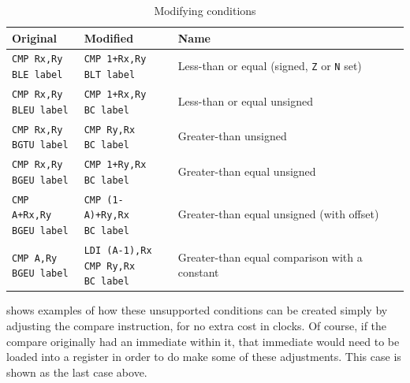 \documentclass{gqtekspec}
\begin{document}
\begin{table}\begin{center}
\begin{tabular}{|l|l|l|}\hline
Original & Modified & Name \\\hline\hline
\parbox[t]{1.5in}{\tt CMP Rx,Ry\\BLE label} %
	& \parbox[t]{1.5in}{\tt CMP 1+Rx,Ry\\BLT label}
	& Less-than or equal (signed, {\tt Z} or {\tt N} set)\\[4mm]\hline
\parbox[t]{1.5in}{\tt CMP Rx,Ry\\BLEU label}
	& \parbox[t]{1.5in}{\tt CMP 1+Rx,Ry\\BC label}
	& Less-than or equal unsigned \\[4mm]\hline
\parbox[t]{1.5in}{\tt CMP Rx,Ry\\BGTU label}	%
	& \parbox[t]{1.5in}{\tt CMP Ry,Rx\\BC label}
	& Greater-than unsigned \\[4mm]\hline
\parbox[t]{1.5in}{\tt CMP Rx,Ry\\BGEU label}	%
	& \parbox[t]{1.5in}{\tt CMP 1+Ry,Rx\\BC label}
	& Greater-than equal unsigned \\[4mm]\hline
\parbox[t]{1.5in}{\tt CMP A+Rx,Ry\\BGEU label} %
	& \parbox[t]{1.5in}{\tt CMP (1-A)+Ry,Rx\\BC label}
	& Greater-than equal unsigned (with offset)\\[4mm]\hline
\parbox[t]{1.5in}{\tt CMP A,Ry\\BGEU label} %
	& \parbox[t]{1.5in}{\tt LDI (A-1),Rx\\CMP Ry,Rx\\BC label}
	& Greater-than equal comparison with a constant\\[4mm]\hline
\end{tabular}
\caption{Modifying conditions}\label{tbl:creating-conditions}
\end{center}\end{table}
shows examples of how these unsupported conditions can be created
simply by adjusting the compare instruction, for no extra cost in clocks.
Of course, if the compare originally had an immediate within it, that immediate
would need to be loaded into a register in order to do make some of these
adjustments.  This case is shown as the last case above.
\end{document}
